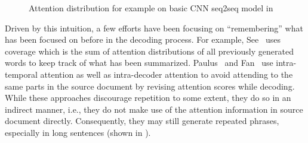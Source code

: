 \begin{figure}[th!]
\centering
{}
\quad
{}
\quad
{}
\caption{Attention distribution for example on basic CNN seq2seq model 
in }
\label{fig:attn_map}
\end{figure}


Driven by this intuition, a few efforts have been focusing on ``remembering''
what has been focused on before in the decoding process. 
For example, See~  
uses coverage which is the sum of
attention distributions of all previously generated words to keep track of 
what has been summarized.  Paulus~ and 
Fan~ use intra-temporal 
attention\cite{NallapatiZSGX16} as well as intra-decoder attention to avoid 
attending to the same parts in the source document by 
revising attention scores while decoding. 
While these approaches discourage repetition to some extent,
they do so in an indirect manner, i.e., they do not 
make use of the attention information in source document directly.
Consequently, they may still generate repeated phrases, 
especially in long sentences (shown in ).

